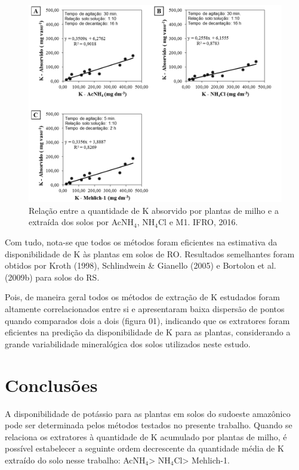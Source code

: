 \documentclass[article,12pt,onesidea,4paper,english,brazil]{abntex2}
\begin{document}
		\begin{figure}[h]
		\centering
		\includegraphics[width=\linewidth]{pip15.png}
		\caption{Relação entre a quantidade de K absorvido por plantas de milho e a extraída dos solos por AcNH$_4$, NH$_4$Cl e M1. IFRO, 2016.}
	\end{figure}
	
	Com tudo, nota-se que todos os métodos foram eficientes na estimativa da disponibilidade de K às plantas em solos de RO. Resultados semelhantes foram obtidos por Kroth (1998), Schlindwein \& Gianello (2005) e Bortolon et al. (2009b) para solos do RS.
	
	Pois, de maneira geral todos os métodos de extração de K estudados foram altamente correlacionados entre si e apresentaram baixa dispersão de pontos quando comparados dois a dois (figura 01), indicando que os extratores foram eficientes na predição da disponibilidade de K para as plantas, considerando a grande variabilidade mineralógica dos solos utilizados neste estudo.
	
	\section*{Conclusões}
	
	A disponibilidade de potássio para as plantas em solos do sudoeste amazônico pode ser determinada pelos métodos testados no presente trabalho.
	Quando se relaciona os extratores à quantidade de K acumulado por plantas de milho, é possível estabelecer a seguinte ordem decrescente da quantidade média de K extraído do solo nesse trabalho: AcNH$_4$> NH$_4$Cl> Mehlich-1.
	
\end{document}
